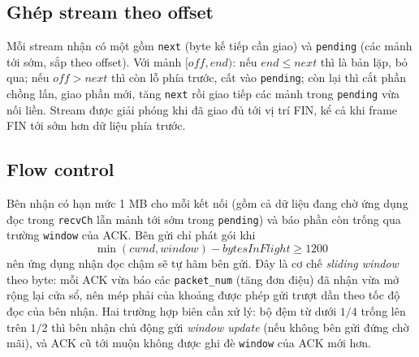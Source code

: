 \subsection{Ghép stream theo offset}
\label{subsec:ghep}
Mỗi stream nhận có một  gồm \texttt{next} (byte kế tiếp cần giao) và \texttt{pending} (các mảnh
tới sớm, sắp theo offset). Với mảnh $[\mathit{off}, \mathit{end})$: nếu $\mathit{end} \le \mathit{next}$ thì là
bản lặp, bỏ qua; nếu $\mathit{off} > \mathit{next}$ thì còn lỗ phía trước, cất vào \texttt{pending}; còn lại thì
cắt phần chồng lấn, giao phần mới, tăng \texttt{next} rồi giao tiếp các mảnh trong \texttt{pending} vừa nối liền.
Stream được giải phóng khi đã giao đủ tới vị trí FIN, kể cả khi frame FIN tới sớm hơn dữ liệu phía trước.

\subsection{Flow control}
\label{subsec:dieu-toc}
Bên nhận có hạn mức 1 MB cho mỗi kết nối (gồm cả dữ liệu đang chờ ứng dụng đọc trong \texttt{recvCh} lẫn mảnh
tới sớm trong \texttt{pending}) và báo phần còn trống qua trường \texttt{window} của ACK. Bên gửi chỉ phát gói khi
\begin{equation}
  \min(\mathit{cwnd}, \mathit{window}) - \mathit{bytesInFlight} \ge 1200
\end{equation}
nên ứng dụng nhận đọc chậm sẽ tự hãm bên gửi. Đây là cơ chế \emph{sliding window} theo byte:
mỗi ACK vừa báo các \texttt{packet\_num} (tăng đơn điệu) đã nhận vừa mở rộng lại cửa sổ, nên mép phải của khoảng
được phép gửi trượt dần theo tốc độ đọc của bên nhận. Hai trường hợp biên cần xử lý: bộ đệm từ dưới $1/4$ trống lên trên
$1/2$ thì bên nhận chủ động gửi \emph{window update} (nếu không bên gửi đứng chờ mãi), và ACK cũ tới muộn không
được ghi đè \texttt{window} của ACK mới hơn.

